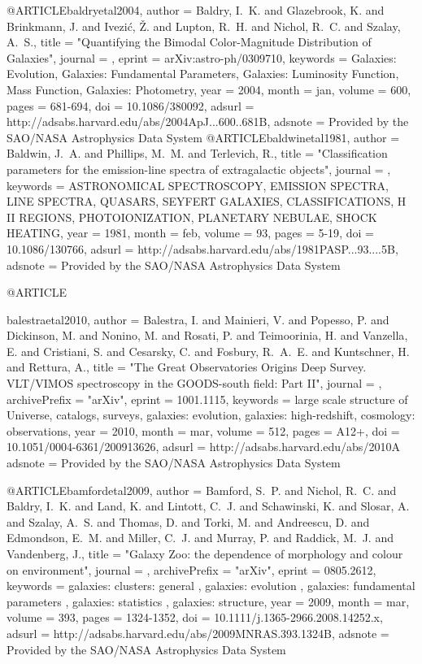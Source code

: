 {{@ARTICLE{baldryetal2004,
   author = {{Baldry}, I.~K. and {Glazebrook}, K. and {Brinkmann}, J. and 
	{Ivezi{\'c}}, {\v Z}. and {Lupton}, R.~H. and {Nichol}, R.~C. and 
	{Szalay}, A.~S.},
    title = "{Quantifying the Bimodal Color-Magnitude Distribution of Galaxies}",
  journal = {\apj},
   eprint = {arXiv:astro-ph/0309710},
 keywords = {Galaxies: Evolution, Galaxies: Fundamental Parameters, Galaxies: Luminosity Function, Mass Function, Galaxies: Photometry},
     year = 2004,
    month = jan,
   volume = 600,
    pages = {681-694},
      doi = {10.1086/380092},
   adsurl = {http://adsabs.harvard.edu/abs/2004ApJ...600..681B},
  adsnote = {Provided by the SAO/NASA Astrophysics Data System}
}
@ARTICLE{baldwinetal1981,
   author = {{Baldwin}, J.~A. and {Phillips}, M.~M. and {Terlevich}, R.},
    title = "{Classification parameters for the emission-line spectra of extragalactic objects}",
  journal = {\pasp},
 keywords = {ASTRONOMICAL SPECTROSCOPY, EMISSION SPECTRA, LINE SPECTRA, QUASARS, SEYFERT GALAXIES, CLASSIFICATIONS, H II REGIONS, PHOTOIONIZATION, PLANETARY NEBULAE, SHOCK HEATING},
     year = 1981,
    month = feb,
   volume = 93,
    pages = {5-19},
      doi = {10.1086/130766},
   adsurl = {http://adsabs.harvard.edu/abs/1981PASP...93....5B},
  adsnote = {Provided by the SAO/NASA Astrophysics Data System}
}

@ARTICLE{balestraetal2010,
   author = {{Balestra}, I. and {Mainieri}, V. and {Popesso}, P. and {Dickinson}, M. and 
	{Nonino}, M. and {Rosati}, P. and {Teimoorinia}, H. and {Vanzella}, E. and 
	{Cristiani}, S. and {Cesarsky}, C. and {Fosbury}, R.~A.~E. and 
	{Kuntschner}, H. and {Rettura}, A.},
    title = "{The Great Observatories Origins Deep Survey. VLT/VIMOS spectroscopy in the GOODS-south field: Part II}",
  journal = {\aap},
archivePrefix = "arXiv",
   eprint = {1001.1115},
 keywords = {large scale structure of Universe, catalogs, surveys, galaxies: evolution, galaxies: high-redshift, cosmology: observations},
     year = 2010,
    month = mar,
   volume = 512,
    pages = {A12+},
      doi = {10.1051/0004-6361/200913626},
   adsurl = {http://adsabs.harvard.edu/abs/2010A%
  adsnote = {Provided by the SAO/NASA Astrophysics Data System}
}


@ARTICLE{bamfordetal2009,
   author = {{Bamford}, S.~P. and {Nichol}, R.~C. and {Baldry}, I.~K. and 
	{Land}, K. and {Lintott}, C.~J. and {Schawinski}, K. and {Slosar}, A. and 
	{Szalay}, A.~S. and {Thomas}, D. and {Torki}, M. and {Andreescu}, D. and 
	{Edmondson}, E.~M. and {Miller}, C.~J. and {Murray}, P. and 
	{Raddick}, M.~J. and {Vandenberg}, J.},
    title = "{Galaxy Zoo: the dependence of morphology and colour on environment}",
  journal = {\mnras},
archivePrefix = "arXiv",
   eprint = {0805.2612},
 keywords = {galaxies: clusters: general , galaxies: evolution , galaxies: fundamental parameters , galaxies: statistics , galaxies: structure},
     year = 2009,
    month = mar,
   volume = 393,
    pages = {1324-1352},
      doi = {10.1111/j.1365-2966.2008.14252.x},
   adsurl = {http://adsabs.harvard.edu/abs/2009MNRAS.393.1324B},
  adsnote = {Provided by the SAO/NASA Astrophysics Data System}
}

}}}
